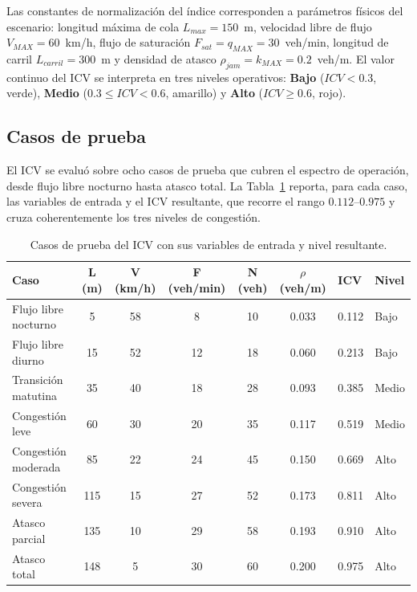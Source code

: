 Las constantes de normalización del índice corresponden a parámetros físicos del escenario:
longitud máxima de cola $L_{max}=150$~m, velocidad libre de flujo $V_{MAX}=60$~km/h, flujo de
saturación $F_{sat}=q_{MAX}=30$~veh/min, longitud de carril $L_{carril}=300$~m y densidad de
atasco $\rho_{jam}=k_{MAX}=0.2$~veh/m. El valor continuo del ICV se interpreta en tres niveles
operativos: \textbf{Bajo} ($ICV<0.3$, verde), \textbf{Medio} ($0.3\leq ICV<0.6$, amarillo) y
\textbf{Alto} ($ICV\geq 0.6$, rojo).

\subsection{Casos de prueba}\label{subsec:icv-casos}

El ICV se evaluó sobre ocho casos de prueba que cubren el espectro de operación, desde flujo
libre nocturno hasta atasco total. La Tabla~\ref{tab:casos-icv} reporta, para cada caso, las
variables de entrada y el ICV resultante, que recorre el rango $0.112$--$0.975$ y cruza
coherentemente los tres niveles de congestión.

\begin{table}[H]
  \centering
  \caption{Casos de prueba del ICV con sus variables de entrada y nivel resultante.}
  \label{tab:casos-icv}
  \begin{tabular}{@{}lcccccll@{}}
    \toprule
    \textbf{Caso} & \textbf{L (m)} & \textbf{V (km/h)} & \textbf{F (veh/min)} &
    \textbf{N (veh)} & \textbf{$\rho$ (veh/m)} & \textbf{ICV} & \textbf{Nivel} \\
    \midrule
    Flujo libre nocturno   & 5   & 58 & 8  & 10 & 0.033 & 0.112 & Bajo  \\
    Flujo libre diurno     & 15  & 52 & 12 & 18 & 0.060 & 0.213 & Bajo  \\
    Transición matutina    & 35  & 40 & 18 & 28 & 0.093 & 0.385 & Medio \\
    Congestión leve        & 60  & 30 & 20 & 35 & 0.117 & 0.519 & Medio \\
    Congestión moderada    & 85  & 22 & 24 & 45 & 0.150 & 0.669 & Alto  \\
    Congestión severa      & 115 & 15 & 27 & 52 & 0.173 & 0.811 & Alto  \\
    Atasco parcial         & 135 & 10 & 29 & 58 & 0.193 & 0.910 & Alto  \\
    Atasco total           & 148 & 5  & 30 & 60 & 0.200 & 0.975 & Alto  \\
    \bottomrule
  \end{tabular}
\end{table}

